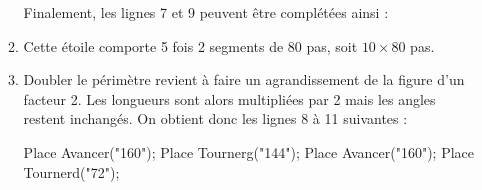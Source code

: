 \begin{enumerate}
\begin{enumerate}
             Finalement, les lignes 7 et 9 peuvent être complétées ainsi : \par \smallskip
          \item Cette étoile comporte 5 fois 2 segments de 80 pas, soit $10\times80$ pas. \par
          \item Doubler le périmètre revient à faire un agrandissement de la figure d'un facteur 2. Les longueurs sont alors multipliées par 2 mais les angles restent inchangés. On obtient donc les lignes 8 à 11 suivantes :
             \begin{center}
                \begin{center}
                   \begin{Scratch}[Echelle=0.8]
                      Place Avancer("160");
                      Place Tournerg("144");
                      Place Avancer("160");
                      Place Tournerd("72");
                   \end{Scratch}
                \end{center} 
             \end{center}
       \end{enumerate}
 \end{enumerate}